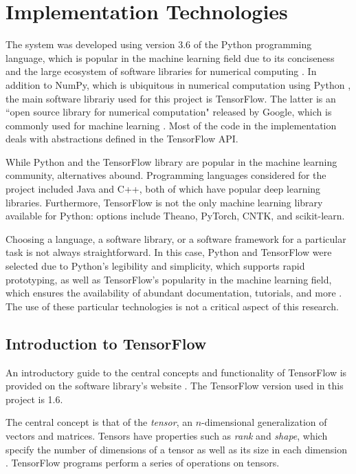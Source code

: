 \documentclass[12pt, titlepage]{report}
\theoremstyle{definition}
\begin{document}
\section{Implementation Technologies}
The system was developed using version 3.6 of the Python programming language, which is popular in the machine learning field due to its conciseness and the large ecosystem of software libraries for numerical computing \cite{numpy}. In addition to NumPy, which is ubiquitous in numerical computation using Python \cite{numpy}, the main software librariy used for this project is TensorFlow. The latter is an ``open source library for numerical computation" released by Google, which is commonly used for machine learning \cite{tensorflow}. Most of the code in the implementation deals with abstractions defined in the TensorFlow API.

While Python and the TensorFlow library are popular in the machine learning community, alternatives abound. Programming languages considered for the project included Java and C++, both of which have popular deep learning libraries. Furthermore, TensorFlow is not the only machine learning library available for Python: options include Theano, PyTorch, CNTK, and scikit-learn.

Choosing a language, a software library, or a software framework for a particular task is not always straightforward. In this case, Python and TensorFlow were selected due to Python's legibility and simplicity, which supports rapid prototyping, as well as TensorFlow's popularity in the machine learning field, which ensures the availability of abundant documentation, tutorials, and more \cite{bhatia2017why}. The use of these particular technologies is not a critical aspect of this research.

\subsection{Introduction to TensorFlow}
An introductory guide to the central concepts and functionality of TensorFlow is provided on the software library's website \cite{tensorflow2018intro}. The TensorFlow version used in this project is 1.6.

The central concept is that of the \textit{tensor}, an $n$-dimensional generalization of vectors and matrices. Tensors have properties such as \textit{rank} and \textit{shape}, which specify the number of dimensions of a tensor as well as its size in each dimension \cite{tensorflow2018intro}. TensorFlow programs perform a series of operations on tensors.
\end{document}
